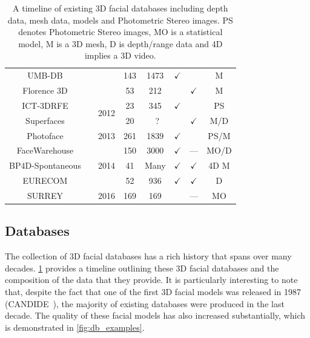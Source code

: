 \begin{table}
{\begin{tabular}{@{}cccccccc@{}}
UMB-DB                      &\cite{colombo2011umb}          &                       & 143         & 1473        & $\checkmark$ &              & M      \\
Florence 3D                 &\cite{bagdanov2011florence}    &                       & 53          & 212         &              & $\checkmark$ & M      \\ \midrule
ICT-3DRFE                   &\cite{stratou2012exploring}    & \multirow{2}{*}{2012} & 23          & 345         & $\checkmark$ &              & PS     \\
Superfaces                  &\cite{berretti2012superfaces}  &                       & 20          &~?           &              & $\checkmark$ & M/D    \\ \midrule                               
Photoface                   &\cite{RefWorks:293}            & 2013                  & 261         & 1839        & $\checkmark$ &              & PS/M   \\ \midrule
FaceWarehouse               &\cite{Cao:2014gy}              & \multirow{3}{*}{2014} & 150         & 3000        & $\checkmark$ & ---          & MO/D   \\
BP4D-Spontaneous            &\cite{Zhang:2014id}            &                       & 41          & Many        & $\checkmark$ & $\checkmark$ & 4D M   \\
EURECOM                     &\cite{min2014kinectfacedb}     &                       & 52          & 936         & $\checkmark$ & $\checkmark$ & D      \\ \midrule
SURREY                      &\cite{Huber:F5Dca9zy}          & 2016                  & 169         & 169         &              & ---          & MO     \\ \bottomrule
\end{tabular}%
}
\caption{A timeline of existing 3D facial databases including depth data, mesh
         data, models and Photometric Stereo images. PS denotes Photometric
         Stereo images, MO is a statistical model, M is a 3D mesh, 
         D is depth/range data and 4D implies a 3D video.}
\label{tbl:timeline_db}
\end{table}
\subsection{Databases}\label{subsec:bg_databases}
The collection of 3D facial databases has a rich history
that spans over many decades. \cref{tbl:timeline_db} provides a
timeline outlining these 3D facial databases and the composition of the 
data that they provide.
It is particularly interesting to note that, despite the fact that one of the
first 3D facial models was released in 1987 (CANDIDE~\cite{Rydfalk:1987tg}), the
majority of existing databases were produced in the last decade. The quality
of these facial models has also increased substantially, which is demonstrated
in \cref{fig:db_examples}. 

